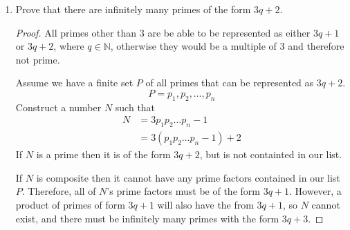 \documentclass[12pt,a4paper,reqno,parskip=full]{amsart}
\numberwithin{equation}{section}
\theoremstyle{plain}
\theoremstyle{definition}
\begin{document}
\begin{enumerate}
\begin{proof}
          This shows that $|\mathbb{E}| = |\mathbb{D}|$.
        \end{proof}
  \item Prove that there are infinitely many primes of the form $3q + 2$.
        \begin{proof}
          All primes other than 3 are be able to be represented as either $3q + 1$ or $3q + 2$,
          where $q\in\mathbb{N}$, otherwise they would be a multiple of 3 and therefore not prime.

          Assume we have a finite set $P$ of all primes that can be represented as $3q + 2$.
          \[P = {p_1, p_2, \dots, p_n}\]
          Construct a number $N$ such that
          \begin{align*}
            N & = 3p_1p_2 \dots p_n - 1       \\
              & = 3(p_1p_2 \dots p_n - 1) + 2
          \end{align*}
          If $N$ is a prime then it is of the form $3q + 2$, but is not containted in our list.

          If $N$ is composite then it cannot have any prime factors contained in our list $P$.
          Therefore, all of $N$'s prime factors must be of the form $3q + 1$. However, a product of
          primes of form $3q + 1$ will also have the from $3q + 1$, so $N$ cannot exist, and there
          must be infinitely many primes with the form $3q + 3$.
        \end{proof}
\end{enumerate}
\end{document}
